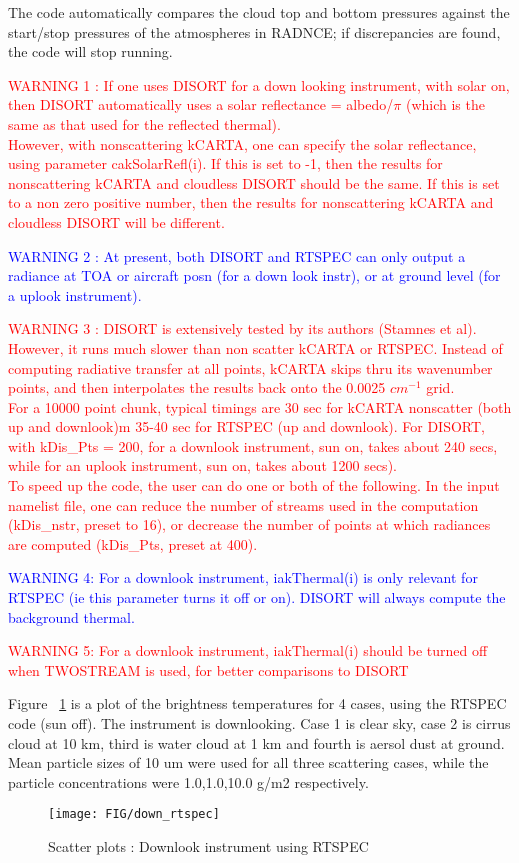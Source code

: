 \documentclass[12pt]{article}
\begin{document}
{{The code automatically compares the cloud top and bottom pressures against the
start/stop pressures of the atmospheres in RADNCE; if discrepancies are found,
the code will stop running.

\textcolor{red} 
{WARNING 1 : If one uses DISORT for a down looking instrument, with solar
on, then DISORT automatically uses a solar reflectance = albedo/$\pi$ (which is
the same as that used for the reflected thermal). \\
However, with nonscattering kCARTA, one can specify the solar reflectance, 
using parameter cakSolarRefl(i).
If this is set to -1, then the results for nonscattering kCARTA and cloudless
DISORT should be the same. If this is set to a non zero positive number, then
the results for nonscattering kCARTA and cloudless DISORT will be different.}

\textcolor{blue}
{WARNING 2 : At present, both DISORT and RTSPEC can only output a 
radiance at TOA or aircraft posn (for a down look instr), or at ground level 
(for a uplook instrument).}

\textcolor{red}
{WARNING 3 : DISORT is extensively tested by its authors (Stamnes et al). 
However, it runs much slower than non scatter kCARTA or RTSPEC. Instead of
computing radiative transfer at all points, kCARTA skips thru its wavenumber
points, and then interpolates the results back onto the 0.0025 $cm^{-1}$ 
grid.\\
For a 10000 point chunk, typical timings are 30 sec for kCARTA nonscatter 
(both up and downlook)m 35-40 sec for RTSPEC (up and downlook). For DISORT,
with kDis\_Pts = 200, for a downlook instrument, sun on, takes about 
240 secs, while for an uplook instrument, sun on, takes about 1200 secs).\\
To speed up the code, the user can do one or both of the following. In the 
input namelist file, one can reduce the number of streams used in the 
computation (kDis\_nstr, preset to 16), or decrease the number of points at 
which radiances are computed (kDis\_Pts, preset at 400).}

\textcolor{blue}
{WARNING 4: For a downlook instrument, iakThermal(i) is only relevant 
for RTSPEC (ie this parameter turns it off or on). DISORT will always compute
the background thermal.}

\textcolor{red}
{WARNING 5: For a downlook instrument, iakThermal(i) should be turned off when
TWOSTREAM is used, for better comparisons to DISORT}

Figure ~\ref{rtspec_down} is a plot of the brightness temperatures for 4 
cases, using the RTSPEC code (sun off). The instrument is downlooking. Case 1 
is clear sky, case 2 is cirrus cloud at 10 km, third is water cloud at 1 km
and fourth is aersol dust at ground. Mean particle sizes of 10 um were used 
for all three scattering cases,  while the particle concentrations were
1.0,1.0,10.0 g/m2 respectively.
\begin{figure}
\texttt{[image: FIG/down\_rtspec]}
\caption{Scatter plots : Downlook instrument using RTSPEC}
\label{rtspec_down}
\end{figure}

}}
\end{document}
